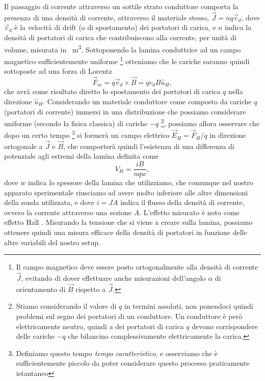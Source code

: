 \documentclass[
    prl,
    reprint, 
    superscriptaddress, 
    altaffilletter, 
    amsmath, 
    amssymb, 
    a4paper,
    varvw]{revtex4-2}
\begin{document}
Il passaggio di corrente attraverso un sottile strato conduttore comporta la presenza di una densità di corrente, attraverso il materiale stesso, $\vec{J}=nq\vec{v}_d$, dove $\vec{v}_d$ è la velocità di drift (o di spostamento) dei portatori di carica, e $n$ indica la densità di portatori di carica che contribuiscono alla corrente, per unità di volume, misurata in \si{\per\cubic\metre}. Sottoponendo la lamina conduttrice ad un campo magnetico sufficientemente uniforme \footnote{Il campo magnetico deve essere posto ortogonalmente alla densità di corrente $\vec{J}$, evitando di dover effettuare anche misurazioni dell'angolo $\alpha$ di orientamento di $\vec{B}$ rispetto a $\vec{J}$.} otteniamo che le cariche saranno quindi sottoposte ad una forza di Lorentz \begin{equation}
    \vec{F}_m = q\vec{v}_d \times \vec{B} = qv_dB\hat{u}_H,\label{eq:lorentz_F_m}
\end{equation} che avrà come risultato diretto lo spostamento dei portatori di carica $q$ nella direzione $\hat{u}_H$. Considerando un materiale conduttore come composto da cariche $q$ (portatori di corrente) immersi in una distribuzione che possiamo considerare uniforme (secondo la fisica classica) di cariche $-q$ \footnote{Stiamo considerando il valore di $q$ in termini assoluti, non ponendoci quindi problemi sul segno dei portatori di un conduttore. Un conduttore è però elettricamente neutro, quindi a dei portatori di carica $q$ devono corrispondere delle cariche $-q$ che bilancino complessivamente elettricamente la carica. }, possiamo allora osservare che dopo un certo tempo \footnote{Definiamo questo tempo \emph{tempo caratteristico}, e osserviamo che è sufficientemente piccolo da poter considerare questo processo praticamente istantaneo} si formerà un campo elettrico $\vec{E}_H = \vec{F}_H/q$ in direzione ortogonale a $\vec{J}$ e $\vec{B}$, che comporterà quindi l'esistenza di una differenza di potenziale agli estremi della lamina definita come \begin{equation}
    V_H = \frac{iB}{nqw},
\end{equation} dove $w$ indica lo spessore della lamina che utilizziamo, che comunque nel nostro apparato sperimentale riusciamo ad avere molto inferiore alle altre dimensioni della sonda utilizzata, e dove $i=JA$ indica il flusso della densità di corrente, ovvero la corrente attraverso una sezione $A$. L'effetto misurato è noto come effetto Hall \cite{Hall_1897}. Misurando la tensione che si viene a creare sulla lamina, possiamo ottenere quindi una misura efficace della densità di portatori in funzione delle altre variabili del nostro setup. 
\end{document}
